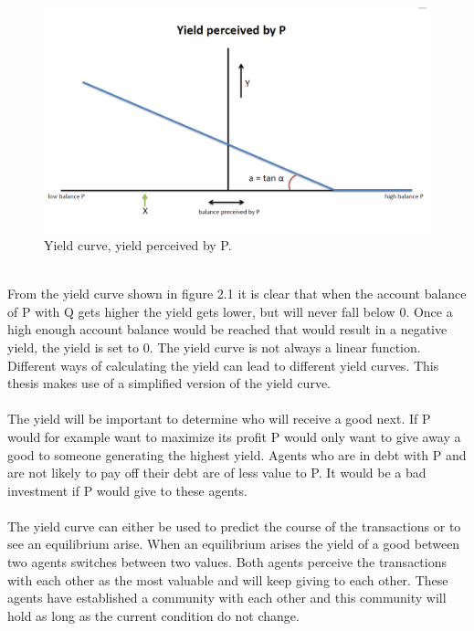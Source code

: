 \documentclass[twoside,openright]{uva-bachelor-thesis}
\begin{document}
\\
\begin{figure}[h!]
   \centering
    \includegraphics[scale=0.4]{YieldCurves/yieldcurve_P}
 \caption{Yield curve, yield perceived by P.}
\end{figure}
\\
From the yield curve shown in figure 2.1 it is clear that when the account balance of P with Q gets higher the yield gets lower, but will never fall below 0. Once a high enough account balance would be reached that would result in a negative yield, the yield is set to 0. The yield curve is not always a linear function. Different ways of calculating the yield can lead to different yield curves. This thesis makes use of a simplified version of the yield curve.
\\
\\
The yield will be important to determine who will receive a good next. If P would for example want to maximize its profit P would only want to give away a good to someone generating the highest yield. Agents who are in debt with P and are not likely to pay off their debt are of less value to P. It would be a bad investment if P would give to these agents.
\\
\\
The yield curve can either be used to predict the course of the transactions or to see an equilibrium arise. When an equilibrium arises the yield of a good between two agents switches between two values.  Both agents perceive the transactions with each other as the most valuable and will keep giving to each other. These agents have established a community with each other and this community will hold as long as the current condition do not change. 
\end{document}

